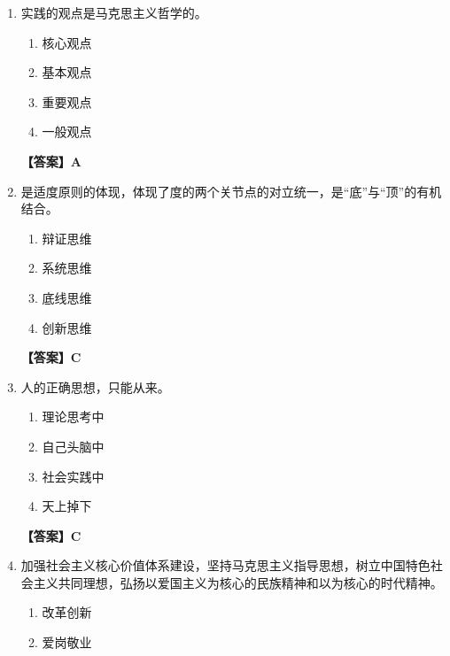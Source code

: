 \documentclass[UTF8,11pt,a4paper]{ctexart}
\begin{document}
\begin{enumerate}[label=\textbf{\arabic*.}, leftmargin=2.5em, itemsep=0.7em]
\begin{enumerate}[label=\Alph*., leftmargin=2em, itemsep=0.1em, topsep=0.15em]
\item 历史人物
\item 人民群众
\item 英雄人物
\item 政治家
\end{enumerate}
\textbf{【答案】B}
\item 实践的观点是马克思主义哲学的\allowbreak\underline{\hspace{4em}}。
\begin{enumerate}[label=\Alph*., leftmargin=2em, itemsep=0.1em, topsep=0.15em]
\item 核心观点
\item 基本观点
\item 重要观点
\item 一般观点
\end{enumerate}
\textbf{【答案】A}
\item \allowbreak\underline{\hspace{4em}}是适度原则的体现，体现了度的两个关节点的对立统一，是“底”与“顶”的有机结合。
\begin{enumerate}[label=\Alph*., leftmargin=2em, itemsep=0.1em, topsep=0.15em]
\item 辩证思维
\item 系统思维
\item 底线思维
\item 创新思维
\end{enumerate}
\textbf{【答案】C}
\item 人的正确思想，只能从\allowbreak\underline{\hspace{4em}}来。
\begin{enumerate}[label=\Alph*., leftmargin=2em, itemsep=0.1em, topsep=0.15em]
\item 理论思考中
\item 自己头脑中
\item 社会实践中
\item 天上掉下
\end{enumerate}
\textbf{【答案】C}
\item 加强社会主义核心价值体系建设，坚持马克思主义指导思想，树立中国特色社会主义共同理想，弘扬以爱国主义为核心的民族精神和以\allowbreak\underline{\hspace{4em}}为核心的时代精神。
\begin{enumerate}[label=\Alph*., leftmargin=2em, itemsep=0.1em, topsep=0.15em]
\item 改革创新
\item 爱岗敬业

\end{enumerate}
\end{enumerate}
\end{document}
